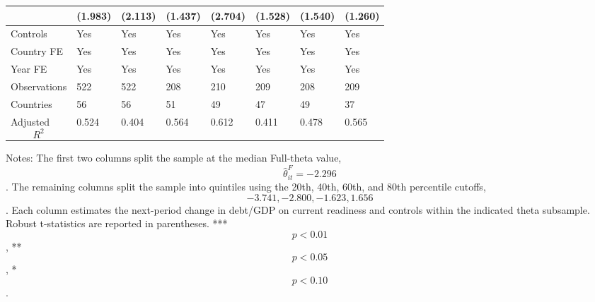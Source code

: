 \begin{table}[H]
\begin{threeparttable}
\begin{tabularx}{\textwidth}{lYYYYYYY}
  & (1.983) & (2.113) & (1.437) & (2.704) & (1.528) & (1.540) & (1.260) \\
\midrule
Controls & Yes & Yes & Yes & Yes & Yes & Yes & Yes \\
Country FE & Yes & Yes & Yes & Yes & Yes & Yes & Yes \\
Year FE & Yes & Yes & Yes & Yes & Yes & Yes & Yes \\
Observations & 522 & 522 & 208 & 210 & 209 & 208 & 209 \\
Countries & 56 & 56 & 51 & 49 & 47 & 49 & 37 \\
Adjusted $$R^2$$ & 0.524 & 0.404 & 0.564 & 0.612 & 0.411 & 0.478 & 0.565 \\
\bottomrule
\end{tabularx}
\begin{tablenotes}[flushleft]\footnotesize
\item Notes: The first two columns split the sample at the median Full-theta value, $$\widehat{\theta}^{F}_{it}=-2.296$$. The remaining columns split the sample into quintiles using the 20th, 40th, 60th, and 80th percentile cutoffs, $$-3.741, -2.800, -1.623, 1.656$$. Each column estimates the next-period change in debt/GDP on current readiness and controls within the indicated theta subsample. Robust t-statistics are reported in parentheses. *** $$p<0.01$$, ** $$p<0.05$$, * $$p<0.10$$.
\end{tablenotes}
\end{threeparttable}
\end{table}
